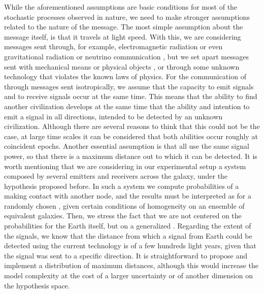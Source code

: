 While the aforementioned assumptions are basic conditions for most of
the stochastic processes observed in nature, we need to make stronger
assumptions related to the nature of the message.
%
The most simple assumption about the message itself, is that it
travels at light speed.
%
With this, we are considering messages sent through, for example,
electromagnetic radiation or even gravitational radiation or neutrino
communication \citep{wright_how_2018}, but we set
apart messages sent with mechanical means or physical objects
\citep[e.g., ][]{Armstrong2013, barlow_galactic_2013}, or through some unknown technology
that violates the known laws of physics.
% 
For the communication of \cetis{} through messages sent isotropically,
we assume that the capacity to emit signals and to receive signals
occur at the same time.
%
This means that the ability to find another civilization develops at
the same time that the ability and intention to emit a signal in all
directions, intended to be detected by an unknown civilization.
%
Although there are several reasons to think that this could not be the
case, at large time scales it can be considered that both abilities
occur roughly at coincident epochs.
%
Another essential assumption is that all \cetis{} use the same signal
power, so that there is a maximum distance out to which it can be
detected.
%
It is worth mentioning that we are considering in our experimental
setup a system composed by several emitters and receivers across the
galaxy, under the hypothesis proposed before.
%
In such a system we compute probabilities of a \ceti{} making contact
with another node, and the results must be interpreted as for a
randomly chosen \ceti{}, given certain conditions of homogeneity on an
ensemble of equivalent galaxies.
%
Then, we stress the fact that we are not centered on the probabilities
for the Earth itself, but on a generalized \ceti{}.
%
Regarding the extent of the signals, we know that the distance from
which a signal from Earth could be detected using the current
technology is of a few hundreds light years, given that the signal was
sent to a specific direction.
%
%
It is straightforward to propose and implement a distribution of
maximum distances, although this would increase the model complexity
at the cost of a larger uncertainty or of another dimension on the
hypothesis space.
%



